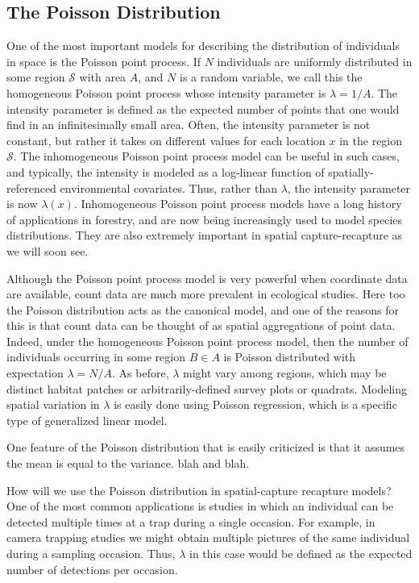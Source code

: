 \subsection{The Poisson Distribution}

One of the most important models for describing the distribution
of individuals in space is the Poisson point
process. If $N$ individuals are uniformly distributed in some region
$\mathcal{S}$ with area $A$, and $N$ is a
random variable, we call this the homogeneous Poisson point process
whose intensity parameter is $\lambda = 1/A$. The intensity parameter
is defined as the expected number of points that one would find in an
infinitesimally small area. Often, the intensity parameter is not
constant, but rather it takes on different values for each location
$x$ in the region $\mathcal{S}$. The inhomogeneous Poisson point
process model can be useful in such cases, and typically, the
intensity is modeled as a log-linear function of spatially-referenced
environmental covariates. Thus, rather than $\lambda$, the intensity
parameter is now $\lambda(x)$. Inhomogeneous Poisson point process
models have a long history of applications in forestry, and are now
being increasingly used to model species distributions. They are also
extremely important in spatial capture-recapture as we will soon see.

Although the Poisson point process model is very powerful when
coordinate data are available, count data are much more prevalent in
ecological studies. Here too the Poisson distribution acts as the
canonical model, and one of the reasons for this is that count data
can be thought of as spatial aggregations of point data.
Indeed, under the homogeneous Poisson point process model,
then the number of individuals occurring in some
region $B \in A$ is Poisson distributed with expectation
$\lambda = N/A$. As before, $\lambda$ might vary among regions, which
may be distinct habitat patches or arbitrarily-defined survey plots or
quadrats. Modeling spatial variation in $\lambda$ is easily done using
Poisson regression, which is a specific type of generalized linear
model.

One feature of the Poisson distribution that is easily criticized is
that it assumes the mean is equal to the variance. blah and blah.

How will we use the Poisson distribution in spatial-capture recapture
models? One of the most common applications is studies in which an
individual can be detected multiple times at a trap during a single
occasion. For example, in camera trapping studies we might obtain
multiple pictures of the same individual during a sampling
occasion. Thus, $\lambda$ in this case would be defined as the
expected number of detections per occasion.



